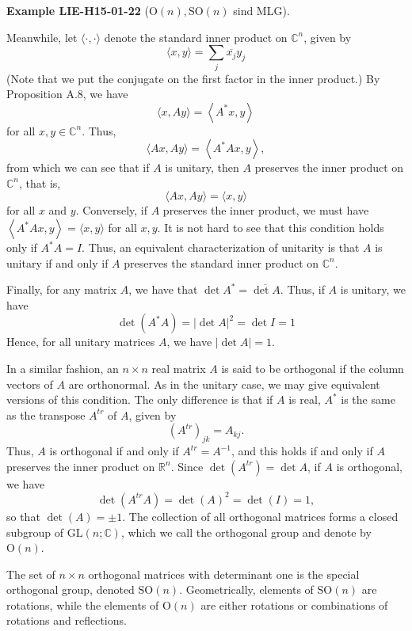 \documentclass[10pt, letterpaper]{article}
\newcommand{\SO}{\mathrm{SO}}
\newcommand{\Ogroup}{\mathrm{O}} %
\newcommand{\CustomHeading}[3]{%
  \par\medskip\noindent%
  \textbf{#1 #2} \textnormal{(#3)}.\enskip%
}
\newenvironment{EXA}[2]{\begin{unitbox}\CustomHeading{Example}{#1}{#2}}{\end{unitbox}}
\begin{document}
\begin{EXA}{LIE-H15-01-22}{$\Ogroup(n), \SO(n)$ sind MLG}
Meanwhile, let $\langle\cdot, \cdot\rangle$ denote the standard inner product on $\mathbb{C}^{n}$, given by
$$
\langle x, y\rangle=\sum_{j} \overline{x_{j}} y_{j}
$$
(Note that we put the conjugate on the first factor in the inner product.) By Proposition A.8, we have
$$
\langle x, A y\rangle=\left\langle A^{*} x, y\right\rangle
$$
for all $x, y \in \mathbb{C}^{n}$. Thus,
$$
\langle A x, A y\rangle=\left\langle A^{*} A x, y\right\rangle,
$$
from which we can see that if $A$ is unitary, then $A$ preserves the inner product on $\mathbb{C}^{n}$, that is,
$$
\langle A x, A y\rangle=\langle x, y\rangle
$$
for all $x$ and $y$. Conversely, if $A$ preserves the inner product, we must have $\left\langle A^{*} A x, y\right\rangle=\langle x, y\rangle$ for all $x, y$. It is not hard to see that this condition holds only if $A^{*} A=I$. Thus, an equivalent characterization of unitarity is that $A$ is unitary if and only if $A$ preserves the standard inner product on $\mathbb{C}^{n}$.

Finally, for any matrix $A$, we have that $\operatorname{det} A^{*}=\overline{\operatorname{det} A}$. Thus, if $A$ is unitary, we have
$$
\operatorname{det}\left(A^{*} A\right)=|\operatorname{det} A|^{2}=\operatorname{det} I=1
$$
Hence, for all unitary matrices $A$, we have $|\operatorname{det} A|=1$.

In a similar fashion, an $n \times n$ real matrix $A$ is said to be orthogonal if the column vectors of $A$ are orthonormal. As in the unitary case, we may give equivalent versions of this condition. The only difference is that if $A$ is real, $A^{*}$ is the same as the transpose $A^{t r}$ of $A$, given by
$$
\left(A^{t r}\right)_{j k}=A_{k j} .
$$
Thus, $A$ is orthogonal if and only if $A^{t r}=A^{-1}$, and this holds if and only if $A$ preserves the inner product on $\mathbb{R}^{n}$. Since $\operatorname{det}\left(A^{t r}\right)=\operatorname{det} A$, if $A$ is orthogonal, we have
$$
\operatorname{det}\left(A^{t r} A\right)=\operatorname{det}(A)^{2}=\operatorname{det}(I)=1,
$$
so that $\operatorname{det}(A)= \pm 1$. The collection of all orthogonal matrices forms a closed subgroup of $\mathrm{GL}(n ; \mathbb{C})$, which we call the orthogonal group and denote by $\mathrm{O}(n)$. 

The set of $n \times n$ orthogonal matrices with determinant one is the special orthogonal group, denoted $\mathrm{SO}(n)$. Geometrically, elements of $\mathrm{SO}(n)$ are rotations, while the elements of $\mathrm{O}(n)$ are either rotations or combinations of rotations and reflections.
\end{EXA}
\end{document}
